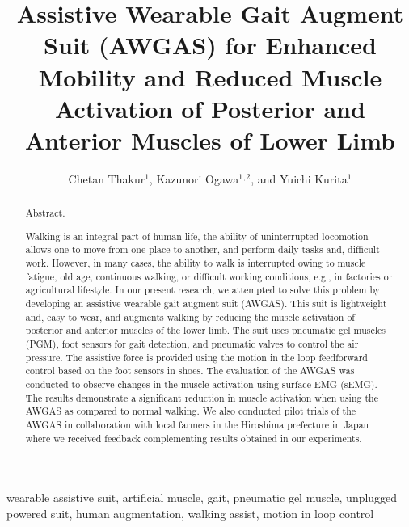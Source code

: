 \documentclass[paper,JRM,paper]{jaciiiarticle}
\begin{document}
\pagestyle{jaciiistyle}

\title{Assistive Wearable Gait Augment Suit (AWGAS) for Enhanced Mobility and Reduced Muscle Activation of Posterior and Anterior Muscles of Lower Limb}
\author{Chetan Thakur$^1$, Kazunori Ogawa$^1$$^,$$^2$, and Yuichi Kurita$^1$}
\address{$^1$Hiroshima University, Hiroshima, Japan\\
		 $^2$ Daiya Industries Co, Ltd. Okayama, Japan\\
         E-mail: chetanthakur@hiroshima-u.ac.jp}
\maketitle

\begin{abstract}%
\noindent Abstract. %

Walking is an integral part of human life, the ability of uninterrupted locomotion allows one to move from one place to another, and perform daily tasks and, difficult work. However, in many cases, the ability to walk is interrupted owing to muscle fatigue, old age, continuous walking, or difficult working conditions, e.g., in factories or agricultural lifestyle. In our present research, we attempted to solve this problem by developing an assistive wearable gait augment suit (AWGAS). This suit is lightweight and, easy to wear, and augments walking by reducing the muscle activation of posterior and anterior muscles of the lower limb. The suit uses pneumatic gel muscles (PGM), foot sensors for gait detection, and pneumatic valves to control the air pressure. The assistive force is provided using the motion in the loop feedforward control based on the foot sensors in shoes. The evaluation of the AWGAS was conducted to observe changes in the muscle activation using surface EMG (sEMG). The results demonstrate a significant reduction in muscle activation when using the AWGAS as compared to normal walking. We also conducted pilot trials of the AWGAS in collaboration with local farmers in the Hiroshima prefecture in Japan where we received feedback complementing results obtained in our experiments.  
\end{abstract}

\begin{keywords}
wearable assistive suit, artificial muscle, gait, pneumatic gel muscle, unplugged powered suit, human augmentation, walking assist, motion in loop control
\end{keywords}
\end{document}
